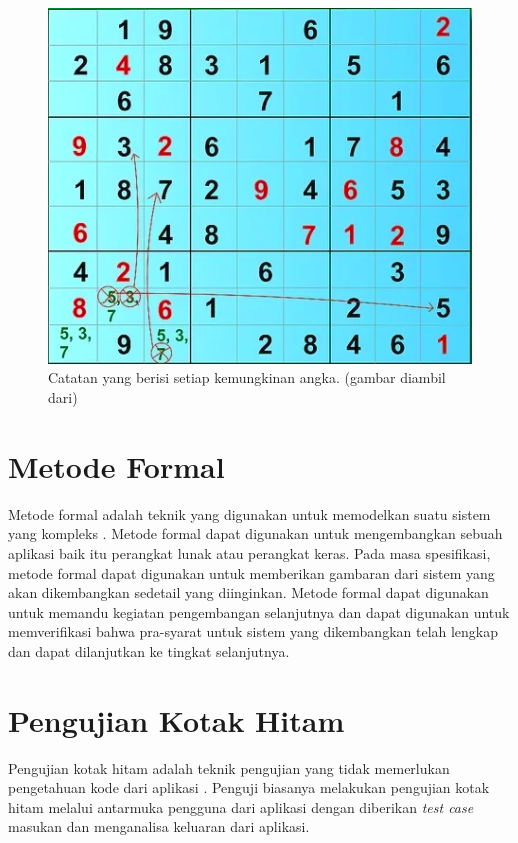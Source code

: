 \begin{figure}[H]
	\begin{centering}
		\includegraphics[scale=0.7]{gambar/solve4}
		
		\caption{Catatan yang berisi setiap kemungkinan angka. (gambar diambil dari)}
		\end{centering}
		\end{figure}
		


\section{Metode Formal}

Metode formal adalah teknik yang digunakan untuk memodelkan suatu
sistem yang kompleks \cite{huth2004logic}. Metode formal dapat digunakan untuk mengembangkan
sebuah aplikasi baik itu perangkat lunak atau perangkat keras. Pada
masa spesifikasi, metode formal dapat digunakan untuk memberikan gambaran
dari sistem yang akan dikembangkan sedetail yang diinginkan. Metode
formal dapat digunakan untuk memandu kegiatan pengembangan selanjutnya
dan dapat digunakan untuk memverifikasi bahwa pra-syarat untuk sistem yang
dikembangkan telah lengkap dan dapat dilanjutkan ke tingkat selanjutnya.

\section{Pengujian Kotak Hitam}

Pengujian kotak hitam adalah teknik pengujian yang tidak memerlukan pengetahuan kode dari aplikasi \cite{TEST1}. Penguji biasanya melakukan pengujian kotak hitam melalui antarmuka pengguna dari aplikasi dengan diberikan \textit{test case} masukan dan menganalisa keluaran dari aplikasi.

